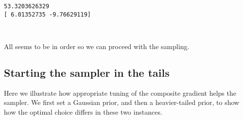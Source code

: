 \documentclass[11pt]{article}
\begin{document}
    \begin{Verbatim}[commandchars=\\\{\}]
53.3203626329
[ 6.01352735 -9.76629119]

    \end{Verbatim}

    \begin{center}
    \end{center}
    { \hspace*{\fill} \\}
    
    All seems to be in order so we can proceed with the sampling.

    \subsection{Starting the sampler in the
tails}\label{starting-the-sampler-in-the-tails}

    Here we illustrate how appropriate tuning of the composite gradient
helps the sampler. We first set a Gaussian prior, and then a
heavier-tailed prior, to show how the optimal choice differs in these
two instances.
\end{document}
